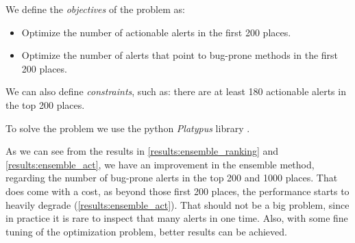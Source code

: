 We define the \textit{objectives} of the problem as:
\begin{itemize}
	\item Optimize the number of actionable alerts in the first 200 places.
	\item Optimize the number of alerts that point to bug-prone methods in the first 200 places.
\end{itemize}

We can also define \textit{constraints}, such as: there are at least 180 actionable alerts in the top 200 places.

To solve the problem we use the python \textit{Platypus} library \cite{platypus}. 

As we can see from the results in \cref{results:ensemble_ranking} and \cref{results:ensemble_act}, we have an improvement in the ensemble method, regarding the number of bug-prone alerts in the top 200 and 1000 places. That does come with a cost, as beyond those first 200 places, the performance starts to heavily degrade (\cref{results:ensemble_act}). That should not be a big problem, since in practice it is rare to inspect that many alerts in one time. Also, with some fine tuning of the optimization problem, better results can be achieved. 


